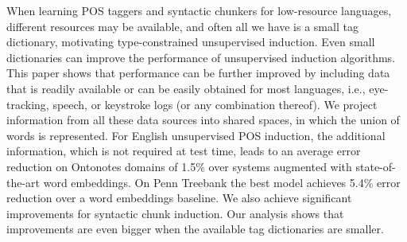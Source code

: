 When learning POS taggers and syntactic chunkers for low-resource languages, different resources may be available, and often all we have is a small tag dictionary, motivating type-constrained unsupervised induction. Even small dictionaries can improve the performance of unsupervised induction algorithms. This paper shows that performance can be further improved by including data that is readily available or can be easily obtained for most languages, i.e., eye-tracking, speech, or keystroke logs (or any combination thereof). We project information from all these data sources into shared spaces, in which the union of words is represented. For English unsupervised POS induction, the additional information, which is not required at test time, leads to an average error reduction on Ontonotes domains of 1.5\% over systems augmented with state-of-the-art word embeddings. On Penn Treebank the best model achieves 5.4\% error reduction over a word embeddings baseline. We also achieve significant improvements for syntactic chunk induction. Our analysis shows that improvements are even bigger when the available tag dictionaries are smaller.
